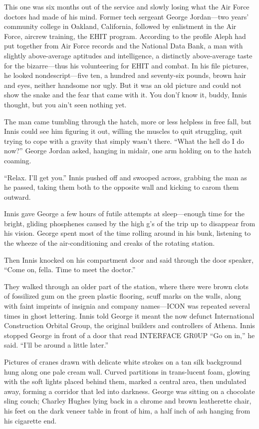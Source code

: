 This one was six months out of the service and slowly losing what the Air Force doctors had made of his mind. Former tech sergeant George Jordan—two years' community college in Oakland, California, followed by enlistment in the Air Force, aircrew training, the EHIT program. According to the profile Aleph had put together from Air Force records and the National Data Bank, a man with slightly above-average aptitudes and intelligence, a distinctly above-average taste for the bizarre—thus his volunteering for EHIT and combat. In his file pictures, he looked nondescript—five ten, a hundred and seventy-six pounds, brown hair and eyes, neither handsome nor ugly. But it was an old picture and could not show the snake and the fear that came with it. You don'f know it, buddy, Innis thought, but you ain't seen nothing yet.

The man came tumbling through the hatch, more or less helpless in free fall, but Innis could see him figuring it out, willing the muscles to quit struggling, quit trying to cope with a gravity that simply wasn't there. ``What the hell do I do now?'' George Jordan asked, hanging in midair, one arm holding on to the hatch coaming.

``Relax. I'll get you.'' Innis pushed off and swooped across, grabbing the man as he passed, taking them both to the opposite wall and kicking to carom them outward.

Innis gave George a few hours of futile attempts at sleep—enough time for the bright, gliding phosphenes caused by the high g's of the trip up to disappear from his vision. George spent most of the time rolling around in his bunk, listening to the wheeze of the air-conditioning and creaks of the rotating station.

Then Innis knocked on his compartment door and said through the door speaker, ``Come on, fella. Time to meet the doctor.''

They walked through an older part of the station, where there were brown clots of fossilized gum on the green plastic flooring, scuff marks on the walls, along with faint imprints of insignia and company names—ICON was repeated several times in ghost lettering. Innis told George it meant the now defunct International Construction Orbital Group, the original builders and controllers of Athena. Innis stopped George in front of a door that read INTERFACE GR0UP ``Go on in,'' he said. ``I'll be around a little later.''

Pictures of cranes drawn with delicate white strokes on a tan silk background hung along one pale cream wall. Curved partitions in trans-lucent foam, glowing with the soft lights placed behind them, marked a central area, then undulated away, forming a corridor that led into darkness. George was sitting on a chocolate sling couch; Charley Hughes lying back in a chrome and brown leatherette chair, his feet on the dark veneer table in front of him, a half inch of ash hanging from his cigarette end.

